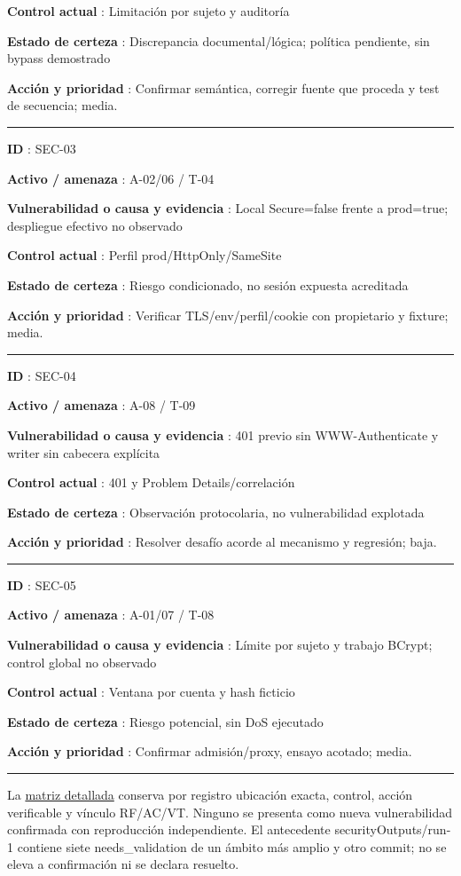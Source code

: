 \documentclass[12pt,a4paper]{report}
\begin{document}
\textbf{Control actual }: Limitación por sujeto y auditoría

\textbf{Estado de certeza }: Discrepancia documental/lógica; política
pendiente, sin bypass demostrado

\textbf{Acción y prioridad }: Confirmar semántica, corregir fuente que
proceda y test de secuencia; media.

\medskip\hrule\medskip

\textbf{ID }: SEC-03

\textbf{Activo / amenaza }: A-02/06 / T-04

\textbf{Vulnerabilidad o causa y evidencia }: Local Secure=false frente
a prod=true; despliegue efectivo no observado

\textbf{Control actual }: Perfil prod/HttpOnly/SameSite

\textbf{Estado de certeza }: Riesgo condicionado, no sesión expuesta
acreditada

\textbf{Acción y prioridad }: Verificar TLS/env/perfil/cookie con
propietario y fixture; media.

\medskip\hrule\medskip

\textbf{ID }: SEC-04

\textbf{Activo / amenaza }: A-08 / T-09

\textbf{Vulnerabilidad o causa y evidencia }: 401 previo sin
WWW-Authenticate y writer sin cabecera explícita

\textbf{Control actual }: 401 y Problem Details/correlación

\textbf{Estado de certeza }: Observación protocolaria, no vulnerabilidad
explotada

\textbf{Acción y prioridad }: Resolver desafío acorde al mecanismo y
regresión; baja.

\medskip\hrule\medskip

\textbf{ID }: SEC-05

\textbf{Activo / amenaza }: A-01/07 / T-08

\textbf{Vulnerabilidad o causa y evidencia }: Límite por sujeto y
trabajo BCrypt; control global no observado

\textbf{Control actual }: Ventana por cuenta y hash ficticio

\textbf{Estado de certeza }: Riesgo potencial, sin DoS ejecutado

\textbf{Acción y prioridad }: Confirmar admisión/proxy, ensayo acotado;
media.

\medskip\hrule\medskip

La \href{../soporte-semanas-4-5/HALLAZGOS_Y_TRAZABILIDAD.md}{matriz
detallada} conserva por registro ubicación exacta, control, acción
verificable y vínculo RF/AC/VT. Ninguno se presenta como nueva
vulnerabilidad confirmada con reproducción independiente. El antecedente
securityOutputs/run-1 contiene siete needs\_validation de un ámbito más
amplio y otro commit; no se eleva a confirmación ni se declara resuelto.
\end{document}
